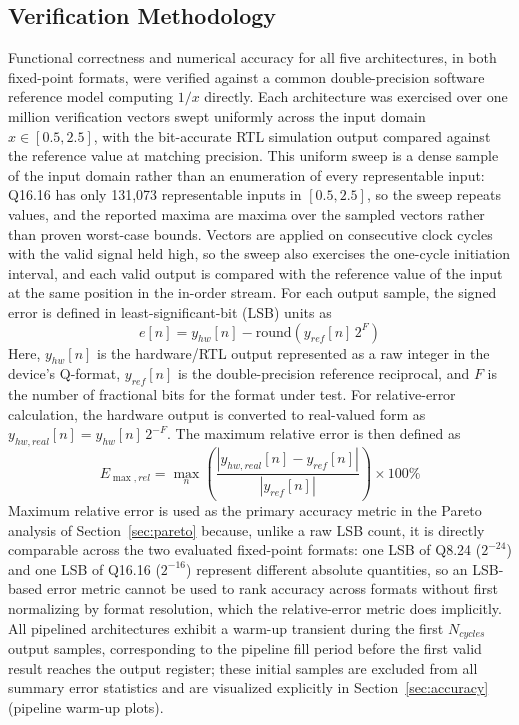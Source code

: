 \documentclass[manuscript,screen,review]{acmart}
\begin{document}
\subsection{Verification Methodology}
\label{sec:verification}

Functional correctness and numerical accuracy for all five architectures, in both fixed-point formats, were verified against a common double-precision software reference model computing $1/x$ directly. Each architecture was exercised over one million verification vectors swept uniformly across the input domain $x \in [0.5, 2.5]$, with the bit-accurate RTL simulation output compared against the reference value at matching precision. This uniform sweep is a dense sample of the input domain rather than an enumeration of every representable input: Q16.16 has only 131,073 representable inputs in $[0.5, 2.5]$, so the sweep repeats values, and the reported maxima are maxima over the sampled vectors rather than proven worst-case bounds. Vectors are applied on consecutive clock cycles with the valid signal held high, so the sweep also exercises the one-cycle initiation interval, and each valid output is compared with the reference value of the input at the same position in the in-order stream. For each output sample, the signed error is defined in least-significant-bit (LSB) units as
\begin{equation}
e[n] = y_{hw}[n] - \mathrm{round}\!\left(y_{ref}[n]\, 2^F\right)
\label{eq:lsberror}
\end{equation}
Here, $y_{hw}[n]$ is the hardware/RTL output represented as a raw integer in the device's Q-format, $y_{ref}[n]$ is the double-precision reference reciprocal, and $F$ is the number of fractional bits for the format under test. For relative-error calculation, the hardware output is converted to real-valued form as $y_{hw,real}[n] = y_{hw}[n]\, 2^{-F}$. The maximum relative error is then defined as
\begin{equation}
E_{\max,rel} = \max_n \left( \frac{|y_{hw,real}[n] - y_{ref}[n]|}{|y_{ref}[n]|} \right) \times 100\%
\label{eq:maxrelerror}
\end{equation}
Maximum relative error is used as the primary accuracy metric in the Pareto analysis of Section~\ref{sec:pareto} because, unlike a raw LSB count, it is directly comparable across the two evaluated fixed-point formats: one LSB of Q8.24 ($2^{-24}$) and one LSB of Q16.16 ($2^{-16}$) represent different absolute quantities, so an LSB-based error metric cannot be used to rank accuracy across formats without first normalizing by format resolution, which the relative-error metric does implicitly. All pipelined architectures exhibit a warm-up transient during the first $N_{cycles}$ output samples, corresponding to the pipeline fill period before the first valid result reaches the output register; these initial samples are excluded from all summary error statistics and are visualized explicitly in Section~\ref{sec:accuracy} (pipeline warm-up plots).
\end{document}
